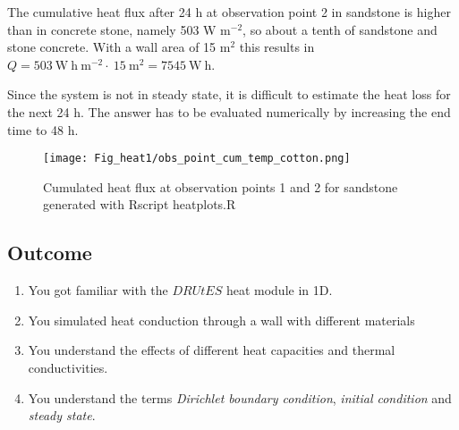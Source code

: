 The cumulative heat flux after 24 h at observation point 2 in sandstone is higher than in concrete stone, namely 503 W m$^{-2}$, so about a tenth of sandstone and stone concrete. With a wall area of 15 m$^2$ this results in $Q = 503~\mathrm{W~h~m^{-2}}\cdot~15~\mathrm{m^{2}}= 7545 ~\mathrm{W~h}$. 

Since the system is not in steady state, it is difficult to estimate the heat loss for the next 24 h. The answer has to be evaluated numerically by increasing the end time to 48 h. 

\begin{figure}[!h]
\centering
\texttt{[image: Fig\_heat1/obs\_point\_cum\_temp\_cotton.png]}
\caption{\label{plot9} Cumulated heat flux at observation points 1 and 2 for sandstone generated with Rscript heatplots.R}
\end{figure}

\newpage
\newpage

\subsection{Outcome}
\begin{enumerate}
\item You got familiar with the $DRUtES$ heat module in 1D.
\item You simulated heat conduction through a wall with different materials
\item You understand the effects of different heat capacities and thermal conductivities.
\item You understand the terms \emph{Dirichlet boundary condition}, \emph{initial condition} and \emph{steady state}.
\end{enumerate}
